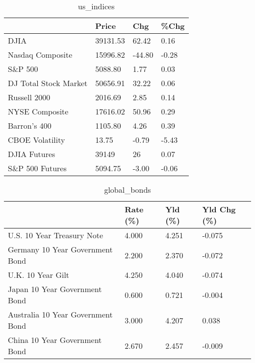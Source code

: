 \documentclass{article}%
\begin{document}
%


\begin{table}[htbp]%
\caption{us\_indices}%
\centering%
\begin{adjustbox}{width=1\textwidth}%
\begin{tabular}{llll}
\toprule
                      &    Price &    Chg &  \%Chg \\
\midrule
                 DJIA & 39131.53 &  62.42 &  0.16 \\
     Nasdaq Composite & 15996.82 & -44.80 & -0.28 \\
              S\&P 500 &  5088.80 &   1.77 &  0.03 \\
DJ Total Stock Market & 50656.91 &  32.22 &  0.06 \\
         Russell 2000 &  2016.69 &   2.85 &  0.14 \\
       NYSE Composite & 17616.02 &  50.96 &  0.29 \\
         Barron's 400 &  1105.80 &   4.26 &  0.39 \\
      CBOE Volatility &    13.75 &  -0.79 & -5.43 \\
         DJIA Futures &    39149 &     26 &  0.07 \\
      S\&P 500 Futures &  5094.75 &  -3.00 & -0.06 \\
\bottomrule
\end{tabular}
%
\end{adjustbox}%
\end{table}

%


\begin{table}[htbp]%
\caption{global\_bonds}%
\centering%
\begin{adjustbox}{width=1\textwidth}%
\begin{tabular}{llll}
\toprule
                                  & Rate (\%) & Yld (\%) & Yld Chg (\%) \\
\midrule
       U.S. 10 Year Treasury Note &    4.000 &   4.251 &      -0.075 \\
  Germany 10 Year Government Bond &    2.200 &   2.370 &      -0.072 \\
                U.K. 10 Year Gilt &    4.250 &   4.040 &      -0.074 \\
    Japan 10 Year Government Bond &    0.600 &   0.721 &      -0.004 \\
Australia 10 Year Government Bond &    3.000 &   4.207 &       0.038 \\
    China 10 Year Government Bond &    2.670 &   2.457 &      -0.009 \\
\bottomrule
\end{tabular}
%
\end{adjustbox}%
\end{table}
\end{document}
